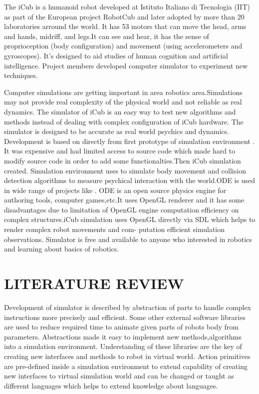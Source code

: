 \documentclass[a4paper, 11pt]{report}
\begin{document}
The iCub is a humanoid robot developed at Istituto Italiano di Tecnologia 
(IIT) 
as part of the European project RobotCub and later adopted by more than 20 
laboratories arround the world. It has 53 motors that can move the head, arms 
and hands, midriff, and legs.It can see and hear, it has the sense of 
proprioception (body configuration) and movement (using accelerometers and 
gyroscopes).
It’s designed to aid studies of human cognition and artificial 
intelligence. Project members developed computer simulator to experiment new 
techniques.
\par Computer simulations are getting important in area robotics 
area.Simulations may not provide real complexity of the physical world and 
not reliable as real dynamics. The simulator of iCub is an easy way to test 
new algorithms and methods instead of dealing with complex configuration of 
iCub hardware. The simulator is designed to be accurate as real world 
psychics and dynamics. Development is based on directly from first prototype 
of simulation 
environment \cite{Webots}. It was expensive and had limited access to 
source code which made hard to modify source code in order to add some 
functionalties.Then iCub simulation created. Simulation environment uses 
\cite{ODE}\linebreak to simulate body movement and collision detection 
algorithms to 
measure psychical interaction with the world.ODE is used in wide range of 
projects like \cite{Gazebo}. ODE is an open source physics engine for 
authoring tools, computer 
games,etc.It uses OpenGL renderer and it has some disadvantages due to 
limitation of OpenGL engine computation efficiency on complex structures.iCub 
simulation uses OpenGL directly via SDL which helps to render complex robot 
movements and com- putation efficient simulation observations. Simulator is 
free and available to anyone who interested in robotics and learning about 
basics of robotics.
  
\chapter{LITERATURE REVIEW}
Development of simulator is described by abstraction of parts to handle complex 
instructions more precisely and efficient. Some other external software 
libraries are used to reduce required time to animate given parts of robots 
body from parameters. Abstractions made it easy to implement new 
methods,algorithms into a simulation environment. Understanding of these 
libraries are the key of creating new interfaces and methods to robot in 
virtual world.
Action primitives are pre-defined inside a simulation environment to extend 
capability of creating new interfaces to virtual simulation world and can be 
changed or taught as different languages which helps to extend knowledge about  
languages.
\end{document}

